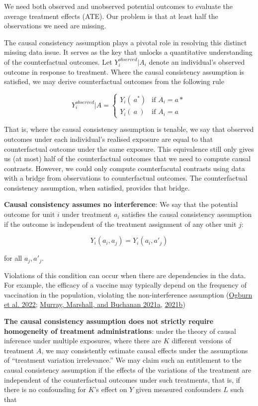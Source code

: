 \documentclass[
  singlecolumn]{article}
\begin{document}
We need both observed and unobserved potential outcomes to evaluate the
average treatment effects (ATE). Our problem is that at least half the
observations we need are missing.

The causal consistency assumption plays a pivotal role in resolving this
distinct missing data issue. It serves as the key that unlocks a
quantitative understanding of the counterfactual outcomes. Let
\(Y_i^{observed}|A_i\) denote an individual's observed outcome in
response to treatment. Where the causal consistency assumption is
satisfied, we may derive counterfactual outcomes from the following rule

\[
Y_i^{observed}|A = 
\begin{cases} 
Y_i(~a^*) & \text{if } A_i = a* \\
Y_i(~a~) & \text{if } A_i = a
\end{cases}
\]

That is, where the causal consistency assumption is tenable, we say that
observed outcomes under each individual's realised exposure are equal to
that counterfactual outcome under the same exposure. This equivalence
still only gives us (at most) half of the counterfactual outcomes that
we need to compute causal contrasts. However, we could only compute
counterfacutal contrasts using data with a bridge from observations to
counterfactual outcomes. The counterfactual consistency assumption, when
satisfied, provides that bridge.

\textbf{Causal consistency assumes no interference}: We say that the
potential outcome for unit \(i\) under treatment \(a_i\) satisfies the
causal consistency assumption if the outcome is independent of the
treatment assignment of any other unit \(j\):

\[
Y_i(a_i, a_j) = Y_i(a_i, a'_j)
\]

for all \(a_j, a'_j\).

Violations of this condition can occur when there are dependencies in
the data. For example, the efficacy of a vaccine may typically depend on
the frequency of vaccination in the population, violating the
non-interference assumption (\protect\hyperlink{ref-ogburn2022}{Ogburn
et al. 2022}; \protect\hyperlink{ref-murray2021}{Murray, Marshall, and
Buchanan 2021a}, \protect\hyperlink{ref-murray2021a}{2021b})

\textbf{The causal consistency assumption does not strictly require
homogeneity of treatment administrations}: under the theory of causal
inference under multiple exposures, where there are \(K\) different
versions of treatment \(A\), we may consistently estimate causal effects
under the assumptions of ``treatment variation irrelevance.'' We may
claim such an entitlement to the causal consistency assumption if the
effects of the variations of the treatment are independent of the
counterfactual outcomes under such treatments, that is, if there is no
confounding for \(K\)'s effect on \(Y\) given measured confounders \(L\)
such that
\end{document}
